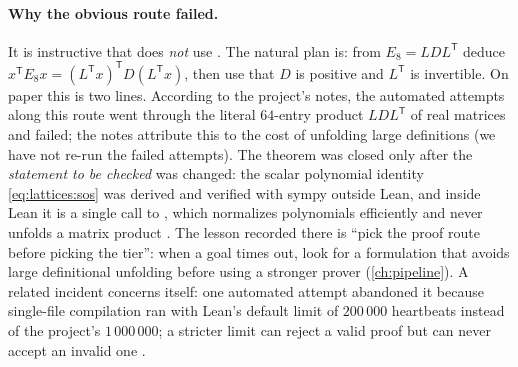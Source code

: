 \paragraph{Why the obvious route failed.} It is instructive that 
does \emph{not} use . The natural plan is: from $E_8=LDL^{\mathsf T}$ deduce
$x^{\mathsf T}E_8x=(L^{\mathsf T}x)^{\mathsf T}D(L^{\mathsf T}x)$, then use that $D$ is
positive and $L^{\mathsf T}$ is invertible. On paper this is two lines. According to the
project's notes, the automated attempts along this route went through the literal $64$-entry
product $LDL^{\mathsf T}$ of real matrices and failed; the notes attribute this to the cost
of unfolding large definitions (we have not re-run the failed attempts). The theorem was
closed only after the \emph{statement to be checked} was changed: the scalar polynomial identity
\eqref{eq:lattices:sos} was derived and verified with sympy outside Lean, and inside Lean it
is a single call to , which normalizes polynomials efficiently and never unfolds
a matrix product .
The lesson recorded there is ``pick the proof route before picking the tier'': when a goal
times out, look for a formulation that avoids large definitional unfolding before using a
stronger prover (\cref{ch:pipeline}). A related incident concerns  itself: one
automated attempt abandoned it because single-file compilation ran with Lean's default limit
of $200\,000$ heartbeats instead of the project's $1\,000\,000$; a stricter limit can reject
a valid proof but can never accept an invalid one .

